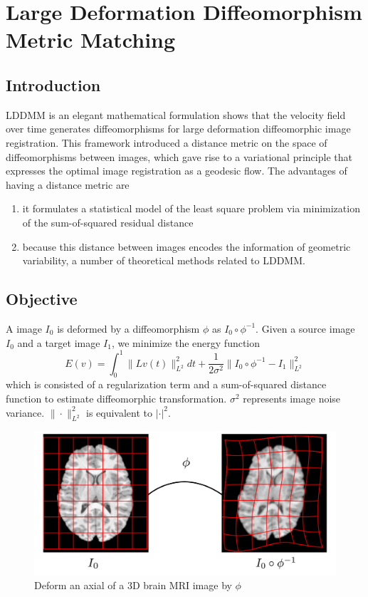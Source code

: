 \documentclass{article}
\theoremstyle{definition}
\theoremstyle{plain}
\begin{document}
\newpage
\section{Large Deformation Diffeomorphism Metric Matching\cite{beg,tang}}
\subsection{Introduction}
LDDMM is an elegant mathematical formulation shows that the velocity field over time generates diffeomorphisms for large deformation diffeomorphic image registration. This framework introduced a distance metric on the space of diffeomorphisms between images, which gave rise to a variational principle that expresses the optimal image registration as a geodesic flow. The advantages of having a distance metric are
\begin{enumerate}
    \item it formulates a statistical model of the least square problem via minimization of the sum-of-squared residual distance
    \item because this distance between images encodes the information of geometric variability, a number of theoretical methods related to LDDMM.
\end{enumerate}

\subsection{Objective}
A image $I_0$ is deformed by a diffeomorphism $\phi$ as $I_0\circ\phi^{-1}$. Given a source image $I_0$ and a target image $I_1$, we minimize the energy function
\begin{equation*}
    E(v)=\int^1_0\|Lv(t)\|^2_{L^2}dt+\frac{1}{2\sigma^2}\|I_0\circ\phi^{-1}-I_1\|^2_{L^2}
\end{equation*}
which is consisted of a regularization term and a sum-of-squared distance function to estimate diffeomorphic transformation. $\sigma^2$ represents image noise variance. $\|\cdot\|^2_{L^2}$ is equivalent to $|\cdot|^2$.
\begin{figure}[H]
\centering
\includegraphics[scale=0.25]{figure/LDDMM.png}
\caption{Deform an axial of a 3D brain MRI image by $\phi$}
\end{figure}
\end{document}
